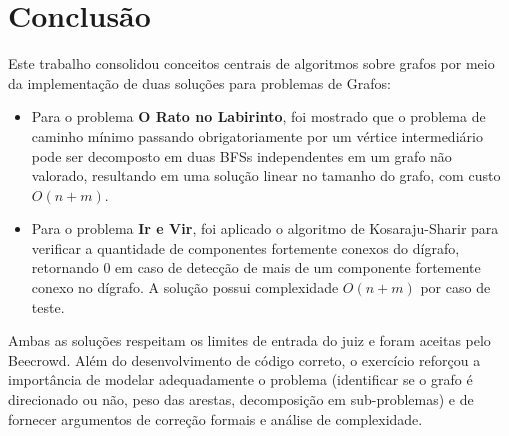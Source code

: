 \documentclass[11pt,a4paper]{article}
\begin{document}
\section{Conclusão}

Este trabalho consolidou conceitos centrais de algoritmos sobre
grafos por meio da implementação de duas soluções para problemas
de Grafos:

\begin{itemize}
    \item Para o problema \textbf{O Rato no Labirinto}, foi mostrado que o problema
    de caminho mínimo passando obrigatoriamente por um vértice
    intermediário pode ser decomposto em
    duas BFSs independentes em um grafo não valorado, resultando em uma solução
    linear no tamanho do grafo, com custo $O(n+m)$.

    \item Para o problema \textbf{Ir e Vir}, foi aplicado o algoritmo
    de Kosaraju-Sharir para verificar a quantidade de componentes fortemente conexos do
    dígrafo, retornando $0$ em caso de detecção de mais de um componente fortemente conexo no dígrafo. A solução possui complexidade $O(n+m)$ por caso de teste.
\end{itemize}

Ambas as soluções respeitam os limites de entrada do
juiz e foram aceitas pelo Beecrowd. Além do desenvolvimento de código correto, o exercício reforçou a importância de modelar adequadamente o problema (identificar se o grafo é direcionado ou não, peso das arestas, decomposição em sub-problemas) e de fornecer
argumentos de correção formais e análise de complexidade.
\end{document}
